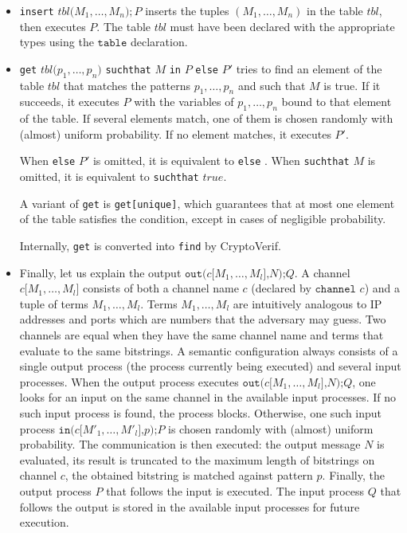 \begin{itemize}
\item \texttt{insert} $\mathit{tbl}\texttt{(}M_1, \ldots, M_n\texttt{)}; P$
inserts the tuples $(M_1, \ldots, M_n)$ in the table $\mathit{tbl}$, 
then executes $P$.
The table $\mathit{tbl}$ must have been declared with the appropriate
types using the $\texttt{table}$ declaration.

\item \texttt{get} $\mathit{tbl}\texttt{(}p_1, \ldots, p_n\texttt{)}$ \texttt{suchthat} $M$ \texttt{in} $P$ \texttt{else} $P'$ tries to find an element of the table $\mathit{tbl}$ that matches the patterns $p_1, \ldots, p_n$ and such that $M$ is true. If it succeeds, it executes $P$ with the variables of $p_1, \ldots, p_n$ bound to that element of the table. If several elements match, one of them is chosen randomly with (almost) uniform probability. If no element matches, it executes $P'$. 

When \texttt{else} $P'$ is omitted, it is equivalent to \texttt{else} \yield. When \texttt{suchthat} $M$ is omitted, it is equivalent to \texttt{suchthat} $\mathit{true}$. 

A variant of {\tt get} is {\tt get[unique]}, which guarantees that at most one element of the table satisfies the condition, except in cases of negligible probability.

Internally, \texttt{get} is converted into \texttt{find} by CryptoVerif.

\ifchannels
\item
Finally, let us explain the output $\texttt{out(}c\texttt{[}M_1,
\ldots, M_l\texttt{],}N\texttt{);}Q$.  A channel $c\texttt{[}M_1,
\ldots, M_l\texttt{]}$ consists of both a channel name $c$ (declared
by $\texttt{channel }c$) and a tuple of terms $M_1, \ldots, M_l$.  Terms
$M_1, \ldots, M_l$ are intuitively analogous to IP addresses and ports
which are numbers that the adversary may guess.  Two channels are
equal when they have the same channel name and terms that evaluate to
the same bitstrings.
%
A semantic configuration always consists of a single output process
(the process currently being executed) and several input processes.
When the output process executes $\texttt{out(}c\texttt{[}M_1, \ldots,
M_l\texttt{],}N\texttt{);}Q$, one looks for an input on the same
channel in the available input processes. If no such input process is
found, the process blocks.  Otherwise, one such input process
$\texttt{in(}c\texttt{[}M'_1, \ldots, M'_l\texttt{],}p\texttt{);}P $
is chosen randomly with (almost) uniform probability. The communication is then
executed: the output message $N$ is evaluated, its result is truncated
to the maximum length of bitstrings on channel $c$, the obtained
bitstring is matched against pattern $p$.  Finally, the output process
$P$ that follows the input is executed. The input process $Q$ that
follows the output is stored in the available input processes for
future execution.


\end{itemize}
